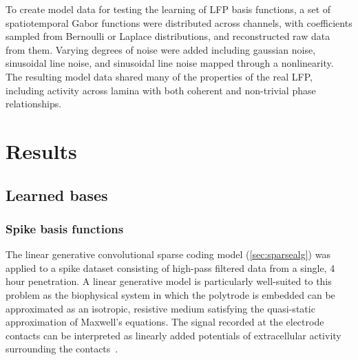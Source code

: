 To create model data for testing the learning of LFP basis functions,
a set of spatiotemporal Gabor functions were distributed across
channels, with coefficients sampled from Bernoulli or Laplace
distributions, and reconstructed raw data from them. Varying degrees
of noise were added including gaussian noise, sinusoidal line noise,
and sinusoidal line noise mapped through a nonlinearity. The resulting
model data shared many of the properties of the real LFP, including
activity across lamina with both coherent and non-trivial phase
relationships.

\section{Results}

\subsection{Learned bases}

\subsubsection{Spike basis functions}
\label{sec:spikebasis}

The linear generative convolutional sparse coding model
(\ref{sec:sparsealg}) was applied to a spike dataset consisting of
high-pass filtered data from a single, 4 hour penetration. A linear
generative model is particularly well-suited to this problem as the
biophysical system in which the polytrode is embedded can be
approximated as an isotropic, resistive medium satisfying the
quasi-static approximation of Maxwell's equations. The signal recorded
at the electrode contacts can be interpreted as linearly added
potentials of extracellular activity surrounding the
contacts~\cite{Pettersen:2008tn}.

